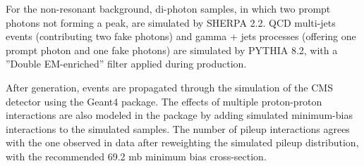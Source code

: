 For the non-resonant background, di-photon samples, in which two prompt photons not forming a peak, are simulated by SHERPA 2.2. QCD multi-jets events (contributing two fake photons) and gamma + jets processes (offering one prompt photon and one fake photons) are simulated by PYTHIA 8.2, with a ”Double EM-enriched” filter applied during production. 


After generation, events are propagated through the simulation of the CMS detector using the
Geant4\cite{AGOSTINELLI2003250} package. The effects of multiple proton-proton interactions are also modeled in the
package by adding simulated minimum-bias interactions to the simulated samples. The number of pileup interactions agrees with the one observed in data after reweighting the simulated pileup distribution, with the recommended 69.2 mb minimum bias cross-section.


\begin{table}[H]
    \centering
    \caption{List of Monte Carlo signal samples used in the analysis with their cross-section\cite{CrossSection_1}. }
    \label{tab:my_labeL_Signal}
\end{table}



